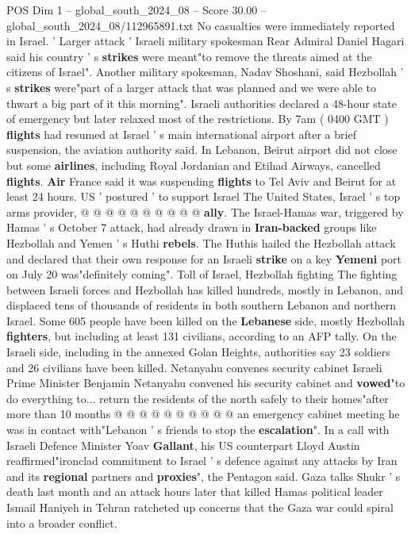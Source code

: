 \begin{textsample}{POS Dim 1 – global\_south\_2024\_08 – Score 30.00 – global\_south\_2024\_08/112965891.txt}
No casualties were immediately reported in Israel. ' Larger attack ' Israeli military spokesman Rear Admiral Daniel Hagari said his country ' s \textbf{strikes} were meant"to remove the threats aimed at the citizens of Israel".
Another military spokesman, Nadav Shoshani, said Hezbollah ' s \textbf{strikes} were"part of a larger attack that was planned and we were able to thwart a big part of it this morning".
Israeli authorities declared a 48-hour state of emergency but later relaxed most of the restrictions.
By 7am ( 0400 GMT ) \textbf{flights} had resumed at Israel ' s main international airport after a brief suspension, the aviation authority said.
In Lebanon, Beirut airport did not close but some \textbf{airlines}, including Royal Jordanian and Etihad Airways, cancelled \textbf{flights}. \textbf{Air} France said it was suspending \textbf{flights} to Tel Aviv and Beirut for at least 24 hours.
US ' postured ' to support Israel The United States, Israel ' s top arms provider, @ @ @ @ @ @ @ @ @ @ \textbf{ally}.
The Israel-Hamas war, triggered by Hamas ' s October 7 attack, had already drawn in \textbf{Iran-backed} groups like Hezbollah and Yemen ' s Huthi \textbf{rebels}.
The Huthis hailed the Hezbollah attack and declared that their own response for an Israeli \textbf{strike} on a key \textbf{Yemeni} port on July 20 was"definitely coming".
Toll of Israel, Hezbollah fighting The fighting between Israeli forces and Hezbollah has killed hundreds, mostly in Lebanon, and displaced tens of thousands of residents in both southern Lebanon and northern Israel.
Some 605 people have been killed on the \textbf{Lebanese} side, mostly Hezbollah \textbf{fighters}, but including at least 131 civilians, according to an AFP tally.
On the Israeli side, including in the annexed Golan Heights, authorities say 23 soldiers and 26 civilians have been killed.
Netanyahu convenes security cabinet Israeli Prime Minister Benjamin Netanyahu convened his security cabinet and \textbf{vowed}"to do everything to... return the residents of the north safely to their homes"after more than 10 months @ @ @ @ @ @ @ @ @ @ an emergency cabinet meeting he was in contact with"Lebanon ' s friends to stop the \textbf{escalation}".
In a call with Israeli Defence Minister Yoav \textbf{Gallant}, his US counterpart Lloyd Austin reaffirmed"ironclad commitment to Israel ' s defence against any attacks by Iran and its \textbf{regional} partners and \textbf{proxies}", the Pentagon said.
Gaza talks Shukr ' s death last month and an attack hours later that killed Hamas political leader Ismail Haniyeh in Tehran ratcheted up concerns that the Gaza war could spiral into a broader conflict.

\end{textsample}
